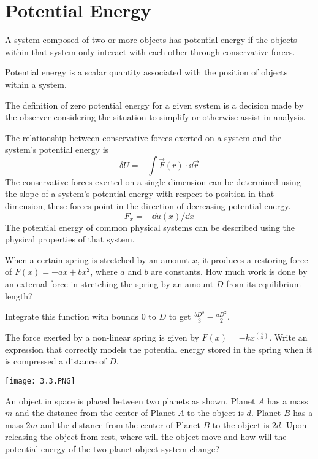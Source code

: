 \documentclass[../mech.tex]{subfiles}
\begin{document}
\section{Potential Energy}
A system composed of two or more objects has potential energy if the objects within that system only interact with each other through conservative forces.

Potential energy is a scalar quantity associated with the position of objects within a system.

The definition of zero potential energy for a given system is a decision made by the observer considering the situation to simplify or otherwise assist in analysis.

The relationship between conservative forces exerted on a system and the system's potential energy is 
\[ \delta U = -\int \vec{F}(r)\cdot \dd \vec{r} \]
The conservative forces exerted on a single dimension can be determined using the slope of a system's potential energy with respect to position in that dimension, these forces point in the direction of decreasing potential energy.
\[ F_x = -\dd u(x)/\dd x\]
The potential energy of common physical systems can be described using the physical properties of that system.

\begin{example}
    When a certain spring is stretched by an amount $x$, it produces a restoring force of $F(x)=-ax+bx^2$, where $a$ and $b$ are constants. How much work is done by an external force in stretching the spring by an amount $D$ from its equilibrium length?

    Integrate this function with bounds $0$ to $D$ to get $\frac{bD^3}{3}-\frac{aD^2}{2}$.
\end{example}

\ex The force exerted by a non-linear spring is given by $F(x)=-kx^{\left(\frac{4}{3}\right)}$. Write an expression that correctly models the potential energy stored in the spring when it is compressed a distance of $D$.

\ex \begin{center}
    \texttt{[image: 3.3.PNG]}
\end{center}
An object in space is placed between two planets as shown. Planet $A$ has a mass $m$ and the distance from the center of Planet $A$ to the object is $d$. Planet $B$ has a mass $2m$ and the distance 
from the center of Planet $B$ to the object is $2d$. Upon releasing the object from rest, where will the object move and how will the potential energy of the two-planet object system change?
\end{document}
